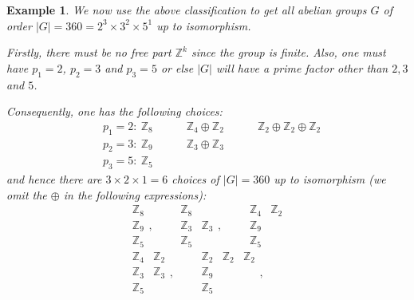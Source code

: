 \documentclass[12pt]{amsbook}
\newtheorem{example}[theorem]{Example}
\begin{document}
\begin{example}
    We now use the above classification to get all abelian groups $G$ of order $|G| = 360 = 2^3 \times 3^2 \times 5^1$ up to isomorphism. 

    Firstly, there must be no free part $\mathbb{Z}^k$ since the group is finite. Also, one must have $p_1 = 2$, $p_2 = 3$ and $p_3 = 5$ or else $|G|$ will have a prime factor other than $2, 3$ and $5$.

    Consequently, one has the following choices:
    \begin{align*}
    &p_1 = 2:\ \mathbb{Z}_8 \quad \quad \quad \mathbb{Z}_4 \oplus \mathbb{Z}_2 \quad \quad \quad \mathbb{Z}_2 \oplus \mathbb{Z}_2 \oplus \mathbb{Z}_2 \\
    &p_2 = 3:\ \mathbb{Z}_9 \quad \quad \quad \mathbb{Z}_3 \oplus \mathbb{Z}_3 \\
    &p_3 = 5:\ \mathbb{Z}_5 
    \end{align*}
    and hence there are $3 \times 2 \times 1 = 6$ choices of $|G| = 360$ up to isomorphism (we omit the $\oplus$ in the following expressions):
    $$\begin{matrix}
        \mathbb{Z}_8 \\
        \mathbb{Z}_9 \\
        \mathbb{Z}_5
    \end{matrix}, \quad \quad 
    \begin{matrix}
        \mathbb{Z}_8 &\\
        \mathbb{Z}_3 & \mathbb{Z}_3 \\
        \mathbb{Z}_5 &
    \end{matrix}, \quad \quad 
    \begin{matrix}
        \mathbb{Z}_4 & \mathbb{Z}_2\\
        \mathbb{Z}_9 &  \\
        \mathbb{Z}_5 &
    \end{matrix}$$
$$\begin{matrix}
        \mathbb{Z}_4 & \mathbb{Z}_2 \\
        \mathbb{Z}_3 & \mathbb{Z}_3 \\
        \mathbb{Z}_5
    \end{matrix}, \quad \quad 
    \begin{matrix}
        \mathbb{Z}_2 & \mathbb{Z}_2 & \mathbb{Z}_2 \\
        \mathbb{Z}_9 & & \\
        \mathbb{Z}_5 & &
    \end{matrix}, \quad \quad 
$$
\end{example}
\end{document}

